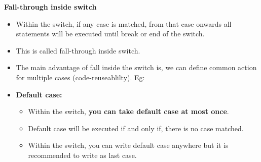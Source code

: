 \begin{flushleft}
	\bigskip
	\bigskip
	\bigskip
	\textbf{Fall-through inside switch}
	\begin{itemize}
		\item Within the switch, if any case is matched, from that case onwards all statements will be executed until break or end of the switch.
		\item This is called fall-through inside switch.
		\item The main advantage of fall inside the switch is, we can define common action for multiple cases (code-reuseablilty).
		\bigskip
		\newpage
		Eg:
		\bigskip
		\item \textbf{Default case:}
		\begin{itemize}
			\item Within the switch, \textbf{you can take default case at most once}.
			\item Default case will be executed if and only if, there is no case matched.
			\item Within the switch, you can write default case anywhere but it is recommended to write as last case. \newline

\end{itemize}
\end{itemize}
\end{flushleft}
